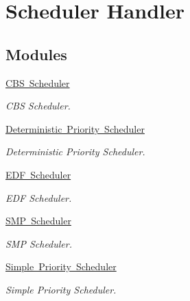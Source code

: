 \hypertarget{group__RTEMSScoreScheduler}{}\section{Scheduler Handler}
\label{group__RTEMSScoreScheduler}
\subsection*{Modules}
\begin{DoxyCompactItemize}
\item 
\mbox{\hyperlink{group__RTEMSScoreSchedulerCBS}{C\+B\+S Scheduler}}
\begin{DoxyCompactList}\small\item\em C\+BS Scheduler. \end{DoxyCompactList}\item 
\mbox{\hyperlink{group__RTEMSScoreSchedulerDPS}{Deterministic Priority Scheduler}}
\begin{DoxyCompactList}\small\item\em Deterministic Priority Scheduler. \end{DoxyCompactList}\item 
\mbox{\hyperlink{group__RTEMSScoreSchedulerEDF}{E\+D\+F Scheduler}}
\begin{DoxyCompactList}\small\item\em E\+DF Scheduler. \end{DoxyCompactList}\item 
\mbox{\hyperlink{group__RTEMSScoreSchedulerSMP}{S\+M\+P Scheduler}}
\begin{DoxyCompactList}\small\item\em S\+MP Scheduler. \end{DoxyCompactList}\item 
\mbox{\hyperlink{group__RTEMSScoreSchedulerSimple}{Simple Priority Scheduler}}
\begin{DoxyCompactList}\small\item\em Simple Priority Scheduler. \end{DoxyCompactList}\end{DoxyCompactItemize}
